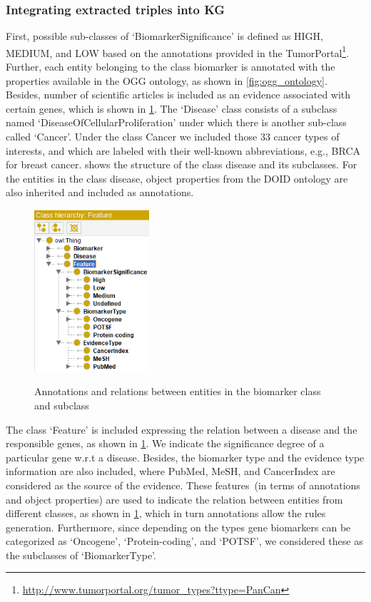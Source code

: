 \subsubsection{Integrating extracted triples into KG}
First, possible sub-classes of `BiomarkerSignificance' is defined as HIGH, MEDIUM, and LOW based on the annotations provided in the TumorPortal\footnote{\url{http://www.tumorportal.org/tumor_types?ttype=PanCan}}. Further, each entity belonging to the class biomarker is annotated with the properties available in the OGG ontology, as shown in \cref{fig:ogg_ontology}. Besides, number of scientific articles is included as an evidence associated with certain genes, which is shown in \cref{fig:biomarker_subclass}. The `Disease' class consists of a subclass named `DiseaseOfCellularProliferation' under which there is another sub-class called `Cancer'. Under the class Cancer we included those 33 cancer types of interests, and which are labeled with their well-known abbreviations, e.g., BRCA for breast cancer.  shows the structure of the class disease and its subclasses. For the entities in the class disease, object properties from the DOID ontology are also inherited and included as annotations. 

\begin{figure}[h]
	\centering
		\includegraphics[width=0.3\linewidth,height=60mm]{images/feature_class.png}
        \label{fig:biomarker_subclass}
	\caption{Annotations and relations between entities in the biomarker class and subclass}
	\vspace{-2mm}
\end{figure}

\hspace*{3.5mm} The class `Feature' is included expressing the relation between a disease and the responsible genes, as shown in \cref{fig:biomarker_subclass}. We indicate the significance degree of a particular gene w.r.t a disease. Besides, the biomarker type and the evidence type information are also included, where PubMed, MeSH, and CancerIndex are considered as the source of the evidence. These features~(in terms of annotations and object properties) are used to indicate the relation between entities from different classes, as shown in \cref{fig:biomarker_subclass}, which in turn annotations allow the rules generation. Furthermore, since depending on the types gene biomarkers can be categorized as `Oncogene', `Protein-coding', and `POTSF', we considered these as the subclasses of `BiomarkerType'. 

